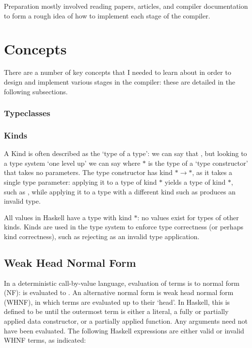 \documentclass[dissertation.tex]{subfiles}
\begin{document}
Preparation mostly involved reading papers, articles, and compiler documentation to form a rough idea of how to
implement each stage of the compiler. 


\section{Concepts}
{

    There are a number of key concepts that I needed to learn about in order to design and implement various stages in
    the compiler: these are detailed in the following subsections.

    \subsubsection{Typeclasses}
    {
    }
    \subsubsection{Kinds}
    {

        A Kind is often described as the `type of a type': we can say that , but looking to a type
        system `one level up' we can say  where \(*\) is the type of a `type constructor' that
        takes no parameters. The type constructor  has kind \(*\rightarrow*\), as it takes a single type
        parameter: applying it to a type of kind \(*\) yields a type of kind \(*\), such as , while
        applying it to a type with a different kind such as  produces an invalid type.
        
        All values in Haskell have a type with kind \(*\): no values exist for types of other kinds. Kinds are used in
        the type system to enforce type correctness (or perhaps kind correctness), such as rejecting 
        as an invalid type application.

    }
    \subsection{Weak Head Normal Form}\label{sec:whnf}
    {

        In a deterministic call-by-value language, evaluation of terms is to normal form (NF):  is evaluated to . An alternative normal form is weak head normal form (WHNF),
        in which terms are evaluated up to their `head'. In Haskell, this is defined to be until the outermost term is
        either a literal, a fully or partially applied data constructor, or a partially applied function. Any arguments
        need not have been evaluated. The following Haskell expressions are either valid or invalid WHNF terms, as
        indicated:

}}
\end{document}

